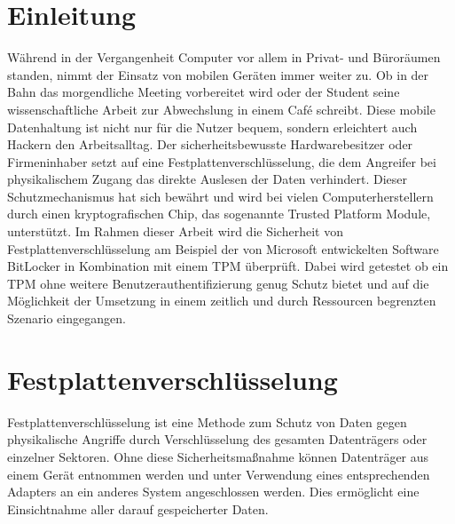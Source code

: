 \documentclass[conference]{IEEEtran}
\begin{document}
\section{Einleitung}
Während in der Vergangenheit Computer vor allem in Privat- und Büroräumen standen, nimmt der Einsatz von mobilen Geräten immer weiter zu. Ob in der Bahn das morgendliche Meeting vorbereitet wird oder der Student seine wissenschaftliche Arbeit zur Abwechslung in einem Café schreibt. Diese mobile Datenhaltung ist nicht nur für die Nutzer bequem, sondern erleichtert auch Hackern den Arbeitsalltag. Der sicherheitsbewusste Hardwarebesitzer oder Firmeninhaber setzt auf eine Festplattenverschlüsselung, die dem Angreifer bei physikalischem Zugang das direkte Auslesen der Daten verhindert. Dieser Schutzmechanismus hat sich bewährt und wird bei vielen Computerherstellern durch einen kryptografischen Chip, das sogenannte Trusted Platform Module, unterstützt. Im Rahmen dieser Arbeit wird die Sicherheit von Festplattenverschlüsselung am Beispiel der von Microsoft entwickelten Software BitLocker in Kombination mit einem TPM überprüft. Dabei wird getestet ob ein TPM ohne weitere Benutzerauthentifizierung genug Schutz bietet und auf die Möglichkeit der Umsetzung in einem zeitlich und durch Ressourcen begrenzten Szenario eingegangen. 

\section{Festplattenverschlüsselung}
Festplattenverschlüsselung ist eine Methode zum Schutz von Daten gegen physikalische Angriffe durch Verschlüsselung des gesamten Datenträgers oder einzelner Sektoren. Ohne diese Sicherheitsmaßnahme können Datenträger aus einem Gerät entnommen werden und unter Verwendung eines entsprechenden Adapters an ein anderes System angeschlossen werden. Dies ermöglicht eine Einsichtnahme aller darauf gespeicherter Daten. \cite{SibingerChristophANDMullerTilo.2014}
\end{document}
